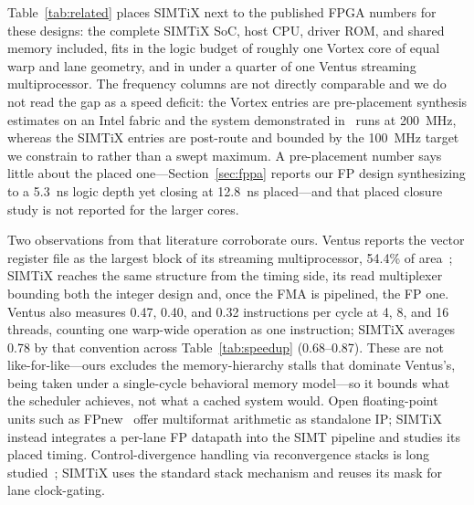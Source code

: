 \documentclass[10pt,conference]{IEEEtran}
\begin{document}
Table~\ref{tab:related} places SIMTiX next to the published FPGA numbers for these
designs: the complete SIMTiX SoC, host CPU, driver ROM, and shared memory
included, fits in the logic budget of roughly one Vortex core of equal warp and
lane geometry, and in under a quarter of one Ventus streaming multiprocessor. The
frequency columns are not directly comparable and we do not read the gap as a
speed deficit: the Vortex entries are pre-placement synthesis estimates on an
Intel fabric and the system demonstrated in~\cite{vortex} runs at 200~MHz, whereas
the SIMTiX entries are post-route and bounded by the 100~MHz target we constrain
to rather than a swept maximum. A pre-placement number says little about the
placed one---Section~\ref{sec:fppa} reports our FP design synthesizing to a 5.3~ns
logic depth yet closing at 12.8~ns placed---and that placed closure study is not
reported for the larger cores.

Two observations from that literature corroborate ours. Ventus reports the vector
register file as the largest block of its streaming multiprocessor, 54.4\% of
area~\cite{ventus25}; SIMTiX reaches the same structure from the timing side, its
read multiplexer bounding both the integer design and, once the FMA is pipelined,
the FP one. Ventus also measures 0.47, 0.40, and 0.32 instructions per cycle at 4,
8, and 16 threads, counting one warp-wide operation as one instruction; SIMTiX
averages 0.78 by that convention across Table~\ref{tab:speedup} (0.68--0.87).
These are not like-for-like---ours excludes the memory-hierarchy stalls that
dominate Ventus's, being taken under a single-cycle behavioral memory model---so
it bounds what the scheduler achieves, not what a cached system would. Open floating-point units such as FPnew~\cite{fpnew} offer
multiformat arithmetic as standalone IP; SIMTiX instead integrates a per-lane FP
datapath into the SIMT pipeline and studies its placed timing. Control-divergence
handling via reconvergence stacks is long studied~\cite{fung,tesla}; SIMTiX uses
the standard stack mechanism and reuses its mask for lane clock-gating.

\end{document}
